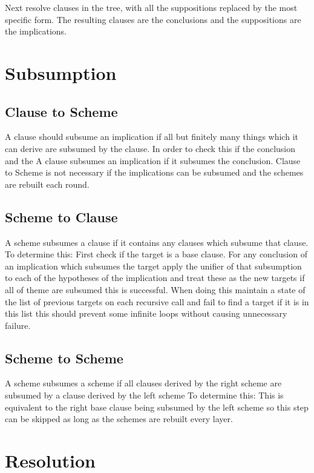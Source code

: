 \documentclass{article}
\begin{document}
Next resolve clauses in the tree, with all the suppositions replaced by the most specific form.
The resulting clauses are the conclusions and the suppositions are the implications.


\section{Subsumption}

\subsection{Clause to Scheme}
  
  A clause should subsume an implication if all but finitely many things which it can derive are subsumed by the clause.
  In order to check this if the conclusion and the 
  A clause subsumes an implication if it subsumes the conclusion.
  Clause to Scheme is not necessary if the implications can be subsumed and the schemes are rebuilt each round.
 
\subsection{Scheme to Clause}
A scheme subsumes a clause if it contains any clauses which subsume that clause.
To determine this: 
  First check if the target is a base clause.
  For any conclusion of an implication which subsumes the target
    apply the unifier of that subsumption to each of the hypotheses of the implication and treat these as the new targets
    if all of theme are subsumed this is successful.
  When doing this maintain a state of the list of previous targets on each recursive call and fail to find a target if it is in this list
  this should prevent some infinite loops without causing unnecessary failure.

\subsection{Scheme to Scheme}

A scheme subsumes a scheme if all clauses derived by the right scheme are subsumed by a clause derived by the left scheme
To determine this:
  This is equivalent to the right base clause being subsumed by the left scheme
  so this step can be skipped as long as the schemes are rebuilt every layer.

\section{Resolution}
\end{document}
